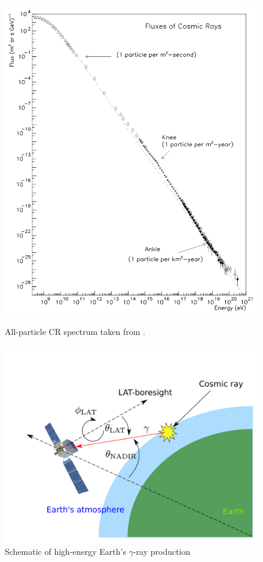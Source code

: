 \begin{figure}[h]
    \begin{minipage}{0.45\textwidth}
        \includegraphics[width=\textwidth]{img/cr_knee_ankle}
        \caption{All-particle CR spectrum taken from \cite{Swordy2001}.}
        \label{cr_knee_ankle}
    \end{minipage}\hspace{2pc}
    \begin{minipage}{0.55\textwidth}
        \includegraphics[width=\textwidth]{img/gamma_production_schematic}
        \caption{Schematic of high-energy Earth's $\gamma$-ray production}
        \label{gamma_production_schematic}
    \end{minipage} 
\end{figure}

